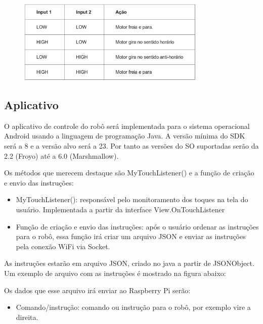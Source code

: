 \begin{figure}[H]
    \centering
    \includegraphics[width=0.8\textwidth]{figuras/tabela_ponte_H_2.eps}
    \caption{}
    \label{fig:catia01}
\end{figure}

\subsection{Aplicativo}
O aplicativo de controle do robô será implementada para o sistema operacional Android usando a linguagem de programação Java. A versão mínima do SDK será a 8 e a versão alvo será a 23. Por tanto as versões do SO suportadas serão da 2.2 (Froyo) até a 6.0 (Marshmallow).

Os métodos que merecem destaque são MyTouchListener() e a função de criação e envio das instruções:
\begin{itemize}
\item MyTouchListener(): responsável pelo monitoramento dos toques na tela do usuário. Implementada a partir da interface View.OnTouchListener
\item Função de criação e envio das instruções: após o usuário ordenar as instruções para o robô, essa função irá criar um arquivo JSON e enviar as instruções pela conexão WiFi via Socket.
\end{itemize}

As instruções estarão em arquivo JSON, criado no java a partir de JSONObject. Um exemplo de arquivo com as instruções é mostrado na figura abaixo:

Os dados que esse arquivo irá enviar ao Raspberry Pi serão:
\begin{itemize}
	\item Comando/instrução: comando ou instrução para o robô, por exemplo vire a direita.
\end{itemize}

